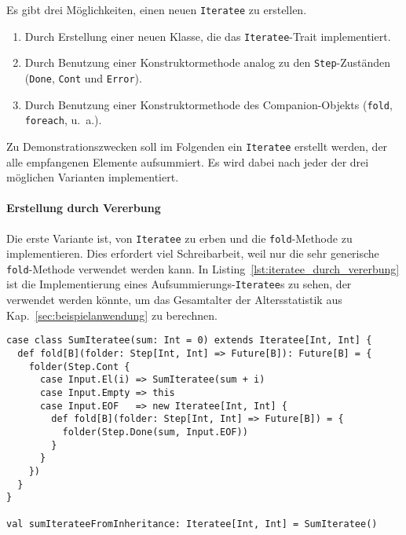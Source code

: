 Es gibt drei Möglichkeiten, einen neuen \lstinline|Iteratee| zu erstellen.
\begin{enumerate}
  \item Durch Erstellung einer neuen Klasse, die das \lstinline|Iteratee|-Trait implementiert.
  \item Durch Benutzung einer Konstruktormethode analog zu den \lstinline|Step|-Zuständen (\lstinline|Done|, \lstinline|Cont| und \lstinline|Error|).
  \item Durch Benutzung einer Konstruktormethode des Companion-Objekts (\lstinline|fold|, \lstinline|foreach|, u.~a.).
\end{enumerate}

Zu Demonstrationszwecken soll im Folgenden ein \lstinline|Iteratee| erstellt werden, der alle empfangenen Elemente aufsummiert.
Es wird dabei nach jeder der drei möglichen Varianten implementiert.

\paragraph{Erstellung durch Vererbung} %
\label{par:erstellung_durch_vererbung}\mbox{} %

Die erste Variante ist, von \lstinline|Iteratee| zu erben und die \lstinline|fold|-Methode zu implementieren.
Dies erfordert viel Schreibarbeit, weil nur die sehr generische \lstinline|fold|-Methode verwendet werden kann.
In Listing~\ref{lst:iteratee_durch_vererbung} ist die Implementierung eines Aufsummierungs-\lstinline|Iteratee|s zu sehen, der verwendet werden könnte, um das Gesamtalter der Altersstatistik aus Kap.~\ref{sec:beispielanwendung} zu berechnen.

\begin{lstlisting}[caption=Erstellung eines Iteratees durch Vererbung, label=lst:iteratee_durch_vererbung]
case class SumIteratee(sum: Int = 0) extends Iteratee[Int, Int] {
  def fold[B](folder: Step[Int, Int] => Future[B]): Future[B] = {
    folder(Step.Cont {
      case Input.El(i) => SumIteratee(sum + i)
      case Input.Empty => this
      case Input.EOF   => new Iteratee[Int, Int] {
        def fold[B](folder: Step[Int, Int] => Future[B]) = {
          folder(Step.Done(sum, Input.EOF))
        }
      }
    })
  }
}

val sumIterateeFromInheritance: Iteratee[Int, Int] = SumIteratee()
\end{lstlisting}

